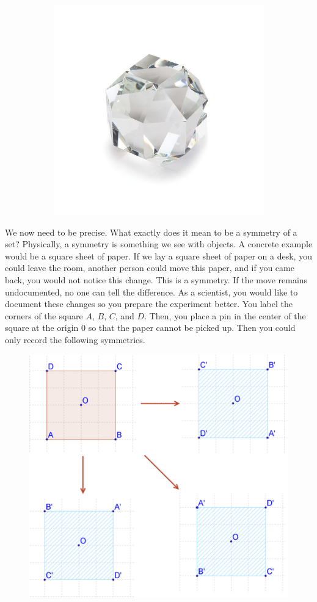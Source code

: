 \documentclass{article}
\theoremstyle{indented}
\begin{document}
\begin{figure}[H]
\begin{subfigure}[b]{0.3\textwidth}
    \includegraphics[width=\textwidth]{symmetric_diamond.jpg}
\end{subfigure}
\end{figure}

We now need to be precise. What exactly does it mean to be a symmetry of a set? Physically, a symmetry is something we see with objects. A concrete example would be a square sheet of paper. If we lay a square sheet of paper on a desk, you could leave the room, another person could move this paper, and if you came back, you would not notice this change. This is a symmetry. If the move remains undocumented, no one can tell the difference. As a scientist, you would like to document these changes so you prepare the experiment better. You label the corners of the square $A$, $B$, $C$, and $D$. Then, you place a pin in the center of the square at the origin $0$ so that the paper cannot be picked up. Then you could only record the following symmetries.

\begin{figure}[H]
    \centering
    \includegraphics[width=.75\textwidth]{square_rotations.jpg}
\end{figure}
\end{document}
